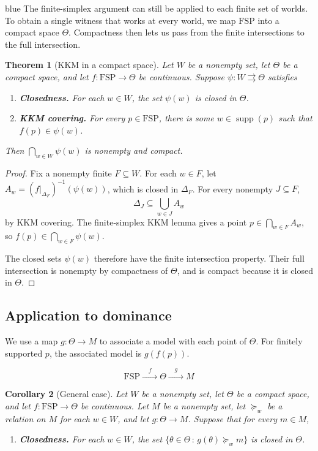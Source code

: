 \documentclass[11pt]{article}
\newtheorem{theorem}{Theorem}[section]
\newtheorem{corollary}[theorem]{Corollary}
\theoremstyle{definition}
\theoremstyle{remark}
\newcommand{\supp}{\operatorname{supp}}
\newcommand{\given}{\,:\,}
\newcommand{\FSP}{\mathrm{FSP}}
\newenvironment{AIwritten}{\begin{color}{blue}}{\end{color}}
\begin{document}
\begin{AIwritten}
	The finite-simplex argument can still be applied to each finite
	set of worlds. To obtain a single witness that works at every
	world, we map $\FSP$ into a compact space $\Theta$. Compactness
	then lets us pass from the finite intersections to the full
	intersection.
	
	\begin{theorem}[KKM in a compact space]
		\label{thm:compact-kkm}
		Let $W$ be a nonempty set, let $\Theta$ be a compact space,
		and let $f\colon\FSP\to\Theta$ be continuous. Suppose
		$\psi\colon W\rightrightarrows\Theta$ satisfies
		\begin{enumerate}
			\item \textbf{Closedness.}
			For each $w\in W$, the set $\psi(w)$ is closed in $\Theta$.
			
			\item \textbf{KKM covering.}
			For every $p\in\FSP$, there is some $w\in\supp(p)$
			such that $f(p)\in\psi(w)$.
		\end{enumerate}
		Then $\bigcap_{w\in W}\psi(w)$ is nonempty and compact.
	\end{theorem}
	
	\begin{proof}
		Fix a nonempty finite $F\subseteq W$. For each $w\in F$,
		let $A_w=(f|_{\Delta_F})^{-1}(\psi(w))$, which is closed
		in $\Delta_F$. For every nonempty $J\subseteq F$,
		\[
		\Delta_J\subseteq\bigcup_{w\in J}A_w
		\]
		by KKM covering. The finite-simplex KKM lemma gives
		a point $p\in\bigcap_{w\in F}A_w$, so
		$f(p)\in\bigcap_{w\in F}\psi(w)$.
		
		The closed sets $\psi(w)$ therefore have the finite
		intersection property. Their full intersection is nonempty
		by compactness of $\Theta$, and is compact because it is
		closed in $\Theta$.
	\end{proof}
	
	\subsection{Application to dominance}
	
	We use a map $g\colon\Theta\to M$ to associate a model with
	each point of $\Theta$. For finitely supported $p$, the
	associated model is $g(f(p))$.
	
	\[
	\FSP \xrightarrow{\quad f\quad} \Theta
	\xrightarrow{\quad g\quad} M
	\]
	
	\begin{corollary}[General case]
		\label{cor:general-dominance}
		Let $W$ be a nonempty set, let $\Theta$ be a compact space,
		and let $f\colon\FSP\to\Theta$ be continuous. Let $M$ be a
		nonempty set, let $\succeq_w$ be a relation on $M$ for each
		$w\in W$, and let $g\colon\Theta\to M$. Suppose that for
		every $m\in M$,
		\begin{enumerate}
			\item \textbf{Closedness.}
			For each $w\in W$, the set
			$\{\theta\in\Theta\given g(\theta)\succeq_w m\}$ is
			closed in $\Theta$.
			

\end{enumerate}
\end{corollary}
\end{AIwritten}
\end{document}
